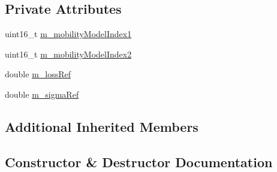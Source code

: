 \subsection*{Private Attributes}
\begin{DoxyCompactItemize}
\item 
uint16\+\_\+t \hyperlink{classBuildingsShadowingTestCase_a48369c8e0004d146992c086981cbcb6b}{m\+\_\+mobility\+Model\+Index1}
\item 
uint16\+\_\+t \hyperlink{classBuildingsShadowingTestCase_a0f84dc1386c8a3a4c99ee510ae76f853}{m\+\_\+mobility\+Model\+Index2}
\item 
double \hyperlink{classBuildingsShadowingTestCase_a7eb9f41d818668469ece643f7fc2a1d6}{m\+\_\+loss\+Ref}
\item 
double \hyperlink{classBuildingsShadowingTestCase_ad4097476ecd00715b6850a37982a5ed6}{m\+\_\+sigma\+Ref}
\end{DoxyCompactItemize}
\subsection*{Additional Inherited Members}


\subsection{Constructor \& Destructor Documentation}
